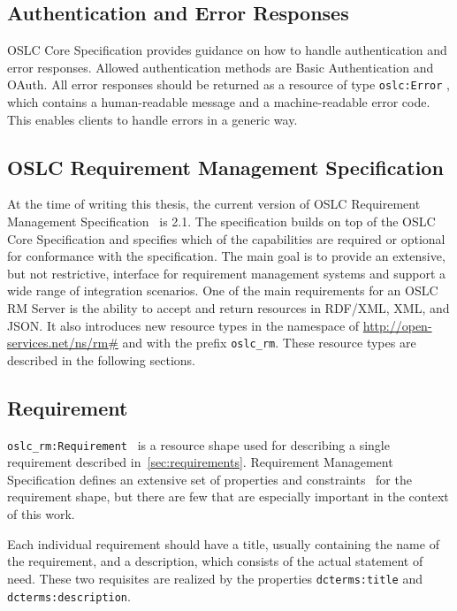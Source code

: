 \subsection*{Authentication and Error Responses}
OSLC Core Specification provides guidance on how to handle authentication and error responses. Allowed authentication methods are Basic Authentication and OAuth. All error responses should be returned as a resource of type \texttt{oslc:Error} \cite{oslc_core_error}, which contains a human-readable message and a machine-readable error code. This enables clients to handle errors in a generic way.

\subsection{OSLC Requirement Management Specification}
At the time of writing this thesis, the current version of OSLC Requirement Management Specification \cite{oslc_requirement_management_specification} is 2.1. The specification builds on top of the OSLC Core Specification and specifies which of the capabilities are required or optional for conformance with the specification. The main goal is to provide an extensive, but not restrictive, interface for requirement management systems and support a wide range of integration scenarios. One of the main requirements for an OSLC RM Server is the ability to accept and return resources in RDF/XML, XML, and JSON. It also introduces new resource types in the namespace of \url{http://open-services.net/ns/rm\#} and with the prefix \texttt{oslc\_rm}. These resource types are described in the following sections.

\subsection*{Requirement}
\texttt{oslc\_rm:Requirement} \cite{oslc_rm_requirement} is a resource shape used for describing a single requirement described in \ref{sec:requirements}. Requirement Management Specification defines an extensive set of properties and constraints \cite{oslc_rm_requirement_constraints} for the requirement shape, but there are few that are especially important in the context of this work.

Each individual requirement should have a title, usually containing the name of the requirement, and a description, which consists of the actual statement of need. These two requisites are realized by the properties \texttt{dcterms:title} and \texttt{dcterms:description}.

